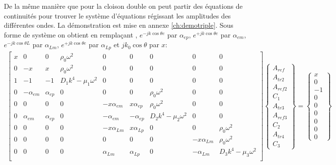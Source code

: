\documentclass[12pt,foolscap]{report}
\begin{document}
	De la même manière que pour la cloison double on peut partir des équations de continuités pour trouver le système d'équations régissant les amplitudes des différentes ondes. La démonstration est mise en annexe \ref{ch:demotriple}.
	Sous forme de système on obtient en remplaçant , $e^{-jk\cos \theta e}$ par $\alpha_{ep}$, $e^{+jk\cos \theta e}$ par $\alpha_{em}$,  $e^{-jk\cos \theta L}$ par $\alpha_{Lm}$, $e^{+jk\cos \theta e}$ par $\alpha_{Lp}$ et $jk_0\cos\theta$ par $x$:
	\begin{align}	
	\begin{bmatrix}
	x   &0 & 0 &\rho_0\omega^2&0&0&0&0&0  \\
	0       & -x & x  &\rho_0\omega^2 & 0&0&0&0&0   \\
	1       & -1 & -1  &D_1k^4-\mu_1 \omega^2 &  0&0&0&0&0  \\
	0    &-\alpha_{em}   & \alpha_{ep}&0   &0&0&\rho_0\omega^2&0&0 \\
	0       & 0 & 0 &0&-x\alpha_{em}   & x\alpha_{ep} & \rho_0\omega^2&0&0  \\
	0     &\alpha_{em}   & \alpha_{ep} &0 &-\alpha_{em}   & -\alpha_{ep}& D_2k^4-\mu_2 \omega^2&0&0  \\
	0&0&0&0&-x\alpha_{Lm}   & x\alpha_{Lp}&0&0&  \rho_0\omega^2\\
	0&0&0&0&0&0&0&-x\alpha_{Lm} &  \rho_0\omega^2\\
	0&0&0&0&\alpha_{Lm}&\alpha_{Lp}&0&-\alpha_{Lm} &  D_3k^4 -\mu_3 \omega^2\\
	\end{bmatrix}
	\begin{Bmatrix}
	A_{ref} \\
	A_{tr2} \\
	A_{ref2}\\
	C_{1} \\
	A_{tr3}\\
	A_{ref3}\\
	C_{2} \\
	A_{tr4}\\
	C_{3} 
	\end{Bmatrix}
	=\begin{Bmatrix}
	x\\
	0 \\
	-1\\
	0\\
	0 \\
	0\\
	0\\
	0\\
	0
	\end{Bmatrix}
	\end{align}
	
\end{document}
